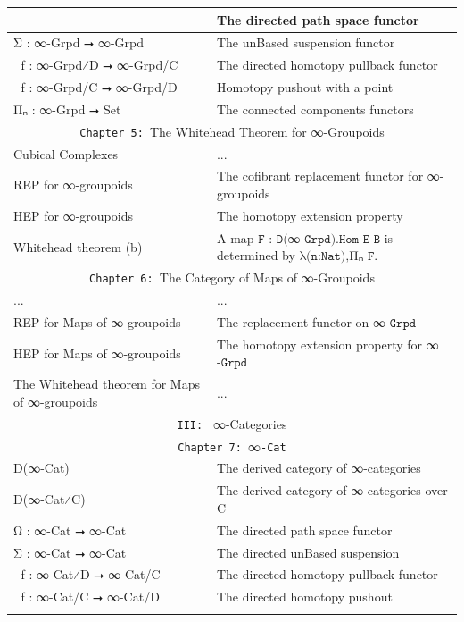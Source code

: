 \documentclass{book}
\theoremstyle{definition}
\begin{document}
{\begin{longtable}{|| l || l ||}
{\hline
Ω⃡ : ∞-Grpd ⭢ ∞-Grpd & The directed path space functor \\
 \hline 
Σ⃡ : ∞-Grpd ⭢ ∞-Grpd & The unBased suspension functor \\
 \hline 
ω⃡ f : ∞-Grpd⁄D ⭢ ∞-Grpd/C & The directed homotopy pullback functor\\
\hline 
σ⃡ f : ∞-Grpd/C ⭢ ∞-Grpd/D & Homotopy pushout with a point \\
 \hline 
Πₙ : ∞-Grpd ⭢ Set & The connected components functors\\
 \hline \hline
 \multicolumn{2}{||c||}{\texttt{Chapter 5: }The Whitehead Theorem for ∞-Groupoids} \\
\hline \hline
Cubical Complexes & ...\\
\hline
REP for ∞-groupoids & The cofibrant replacement functor for ∞-groupoids\\
\hline
HEP for ∞-groupoids & The homotopy extension property\\
\hline
Whitehead theorem (b) & A map $\texttt{F : D(}$∞$\texttt{-Grpd).Hom E B}$ is determined by $\texttt{λ(n:Nat),}$Πₙ
$\texttt{F}$. \\
\hline \hline
\multicolumn{2}{||c||}{\texttt{Chapter 6: }The Category of Maps of ∞-Groupoids} \\
\hline \hline
... & ...\\
\hline
REP for Maps of ∞-groupoids & The replacement functor on ∞$\texttt{-Grpd}$ \\
\hline
HEP for Maps of ∞-groupoids & The homotopy extension property for ∞$\texttt{-Grpd}$\\
 \hline 
The Whitehead theorem for Maps of ∞-groupoids & ... \\
\hline \hline
 \multicolumn{2}{||c||}{\texttt{III: } ∞-Categories} \\
\hline \hline
\multicolumn{2}{||c||}{\texttt{Chapter 7: }∞\texttt{-Cat}} \\
\hline \hline
D(∞-Cat) & The derived category of ∞-categories \\
\hline
D(∞-Cat⁄C) & The derived category of ∞-categories over C \\
\hline
Ω⃗ : ∞-Cat ⭢ ∞-Cat & The directed path space functor \\
 \hline 
 Σ⃗ : ∞-Cat ⭢ ∞-Cat & The directed unBased suspension \\
\hline 
ω⃗ f : ∞-Cat⁄D ⭢ ∞-Cat/C & The directed homotopy pullback functor\\
 \hline 
 σ⃗ f : ∞-Cat/C ⭢ ∞-Cat/D & The directed homotopy pushout \\
}
\end{longtable}}
\end{document}
